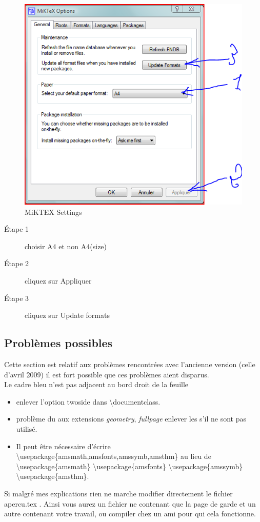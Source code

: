 \documentclass[10pt]{article}
\begin{document}
\begin{figure}[h]
\hspace*{-2cm}  \includegraphics{miktex_option.png}
\caption{MiKTEX Settings}\label{image}
\end{figure}
\begin{description}
 \item[\'Etape 1] choisir A4 et non A4(size)
 \item[\'Etape 2] cliquez sur Appliquer
 \item[\'Etape 3] cliquez sur Update formats
 \end{description}



\subsection{Probl\`emes possibles}

Cette section est  relatif aux probl\`emes rencontr\'ees avec l'ancienne version (celle d'avril 2009) il est fort possible
 que ces probl\`emes aient disparus.\\
	Le cadre bleu n'est pas adjacent au bord droit de la feuille

\begin{itemize}
 \item  enlever l'option twoside dans \textbackslash documentclass.
 \item probl\`eme du aux extensions \emph{geometry}, \emph{fullpage} enlever les s'il ne sont pas utilis\'e.
 \item  Il peut \^etre n\'ecessaire d'\'ecrire\\ 
			\mbox{\textbackslash usepackage\{amsmath,amsfonts,amssymb,amsthm\}}
		 au lieu de \mbox{\textbackslash usepackage\{amsmath\}} \mbox{\textbackslash usepackage\{amsfonts\}} \mbox{\textbackslash usepackage\{amssymb\}} \mbox{\textbackslash usepackage\{amsthm\}}.
\end{itemize}

Si malgr\'e mes explications rien ne marche modifier directement le fichier apercu.tex .
Ainsi vous aurez un fichier ne contenant que la page de garde et un autre contenant votre travail, ou compiler chez un ami pour qui cela fonctionne.
\end{document}
